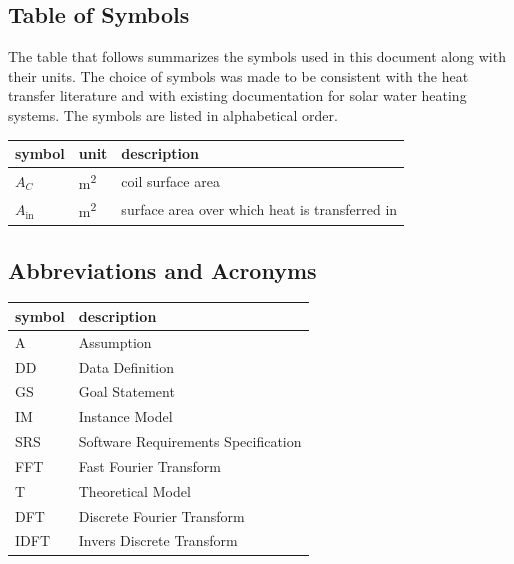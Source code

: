 \documentclass[12pt]{article}
\newcommand{\famname}{FFT} %
\begin{document}
\subsection{Table of Symbols}

The table that follows summarizes the symbols used in this document along with
their units.  The choice of symbols was made to be consistent with the heat
transfer literature and with existing documentation for solar water heating
systems.  The symbols are listed in alphabetical order.

\renewcommand{\arraystretch}{1.2}
\noindent \begin{longtable*}{l l p{12cm}} \toprule
\textbf{symbol} & \textbf{unit} & \textbf{description}\\
\midrule 
$A_C$ & \si[per-mode=symbol] {\square\metre} & coil surface area
\\
$A_\text{in}$ & \si[per-mode=symbol] {\square\metre} & surface area over 
which heat is transferred in
\\ 
\bottomrule
\end{longtable*}

\subsection{Abbreviations and Acronyms}

\renewcommand{\arraystretch}{1.2}
\begin{tabular}{l l} 
  \toprule		
  \textbf{symbol} & \textbf{description}\\
  \midrule 
  A & Assumption\\
  DD & Data Definition\\
  GS & Goal Statement\\
  IM & Instance Model\\
  SRS & Software Requirements Specification\\
  \famname{} & Fast Fourier Transform\\
  T & Theoretical Model\\
  DFT & Discrete Fourier Transform\\
  IDFT & Invers Discrete Transform\\
  \bottomrule
\end{tabular}\\

\end{document}
